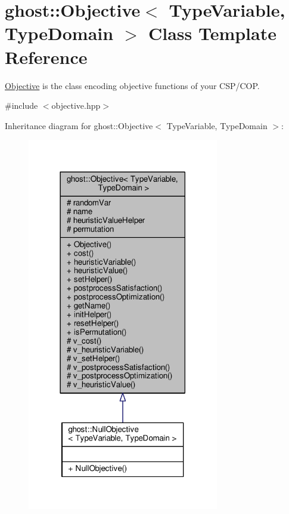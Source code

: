 \hypertarget{classghost_1_1Objective}{}\section{ghost\+:\+:Objective$<$ Type\+Variable, Type\+Domain $>$ Class Template Reference}
\label{classghost_1_1Objective}


\hyperlink{classghost_1_1Objective}{Objective} is the class encoding objective functions of your C\+S\+P/\+C\+OP.  




{\ttfamily \#include $<$objective.\+hpp$>$}



Inheritance diagram for ghost\+:\+:Objective$<$ Type\+Variable, Type\+Domain $>$\+:
\nopagebreak
\begin{figure}[H]
\begin{center}
\leavevmode
\includegraphics[width=237pt]{classghost_1_1Objective__inherit__graph}
\end{center}
\end{figure}


